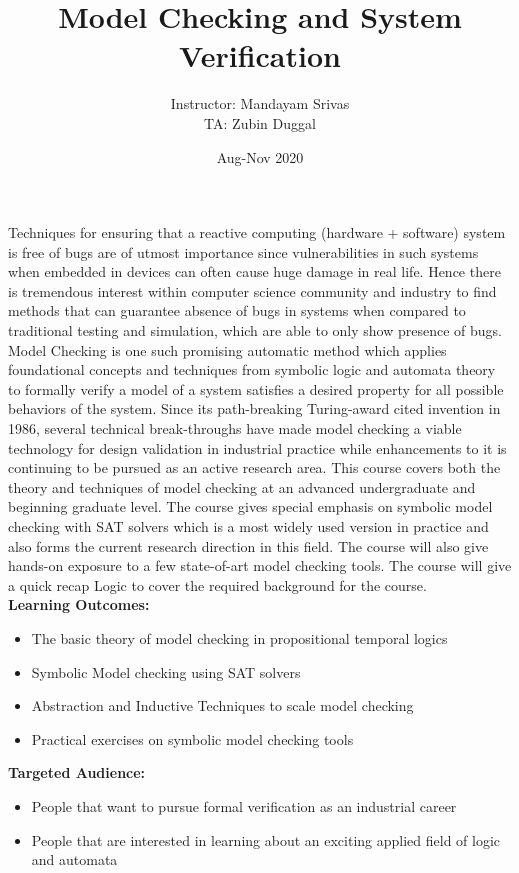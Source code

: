 \documentclass{article}
\title{\textbf{Model Checking and System Verification}}
\author{Instructor: Mandayam Srivas \\
TA: Zubin Duggal}
\date{Aug-Nov 2020}
\begin{document}
\maketitle
\small{
\noindent
Techniques for ensuring that a reactive computing (hardware + software) system is free of bugs are of utmost importance since vulnerabilities in such systems when embedded in devices can often cause huge damage in real life.
Hence there is tremendous interest within computer science community and industry to find methods that can guarantee absence of bugs in systems when compared to traditional testing and simulation, which are able to only show presence of bugs.
Model Checking is one such promising automatic method which applies foundational concepts and techniques from symbolic logic and automata theory to formally verify a model of a system satisfies a desired property for all possible behaviors of the system.
Since its path-breaking Turing-award cited invention in 1986, several technical break-throughs have made model checking a viable technology for design validation in industrial practice while enhancements to it is continuing to be pursued as an active research area.
This course covers both the theory and techniques of model checking at an advanced undergraduate and beginning graduate level.
The course gives special emphasis on symbolic model checking with SAT solvers which is a most widely used version in practice and also forms the current research direction in this field.
The course will also give hands-on exposure to a few state-of-art model checking tools.
The course will give a quick recap Logic to cover the required background for the course. \\[0.25cm]
\noindent
\textbf{Learning Outcomes:}
\begin{itemize}
\item The basic theory of model checking in propositional temporal logics
\item Symbolic Model checking using SAT solvers
\item Abstraction and Inductive Techniques to scale model checking
\item Practical exercises on symbolic model checking tools
\end{itemize}
\noindent
\textbf{Targeted Audience:}
\begin{itemize}
\item People that want to pursue formal verification as an industrial career
\item People that are interested in learning about an exciting applied field of logic and automata

\end{itemize}}
\end{document}
